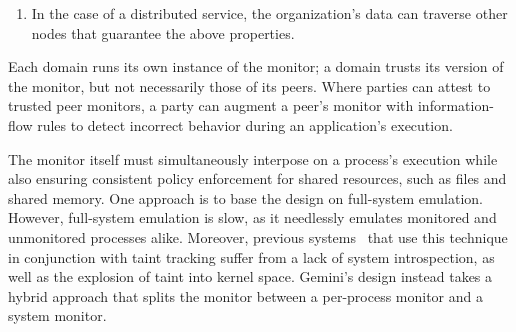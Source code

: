 %


\begin{enumerate}
    \item In the case of a distributed service, the organization's data can
        traverse other nodes that  guarantee the above properties.
\end{enumerate}




Each domain runs its own instance of the monitor; a domain trusts its version
of the monitor, but not necessarily those of its peers.
%
Where parties can attest to trusted peer monitors, a party can augment a peer's
monitor with information-flow rules to detect incorrect behavior during an
application's execution.


The monitor itself must simultaneously interpose on a process's execution while
also ensuring consistent policy enforcement for shared resources, such as files
and shared memory.
%
One approach is to base the design on full-system emulation.
%
However, full-system emulation is slow, as it needlessly emulates
monitored and unmonitored processes alike.
%
Moreover, previous
systems~\cite{whole-system-simulation,panorama,demand-emulation} that use this
technique in conjunction with taint tracking suffer from a lack of system
introspection, as well as the explosion of taint into kernel space.
%
Gemini's design instead takes a hybrid approach that splits the monitor between a
per-process monitor and a system monitor.


